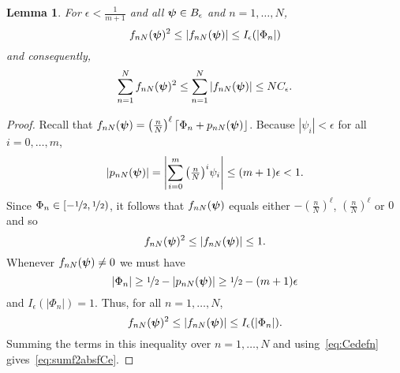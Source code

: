 \documentclass[aap,preprint]{imsart}
\newcommand{\abs}[1]{\left\vert #1 \right\vert}
\newcommand{\round}[1]{{\left\lceil #1 \right\rfloor}}
\newtheorem{lemma}{Lemma}
\begin{document}
\begin{lemma}\label{lem:epslmlemma}
For $\epsilon < \frac{1}{m+1}$ and all $\boldsymbol{\psi} \in B_\epsilon$ and $n = 1, \dots, N$,
\[
f_{nN}(\psibf)^2 \leq \abs{f_{nN}(\psibf)} \leq I_\epsilon(\abs{\Phi_n})
\]
and consequently,
\begin{equation}\label{eq:sumf2absfCe}
\sum_{n=1}^{N}f_{nN}(\psibf)^2 \leq \sum_{n=1}^{N}\abs{f_{nN}(\psibf)} \leq N C_\epsilon.
\end{equation}
\end{lemma}
\begin{proof}
Recall that $f_{nN}(\psibf) = \left( \tfrac{n}{N}\right)^\ell \round{\Phi_n + p_{nN}(\psibf)}$.  Because $\abs{\psi_i} < \epsilon$ for all $i = 0, \dots, m$, 
\begin{equation}\label{eq:pnNsmall}
\abs{p_{nN}(\psibf)} = \abs{\sum_{i=0}^{m}\big(\tfrac{n}{N}\big)^i \psi_i} \leq (m+1)\epsilon < 1.
\end{equation}
Since $\Phi_n \in [-\nicefrac{1}{2}, \nicefrac{1}{2})$, it follows that $f_{nN}(\boldsymbol{\psi})$ equals either $-(\tfrac{n}{N})^\ell$, $(\tfrac{n}{N})^\ell$ or $0$ and so
\begin{equation}\label{eq:fnNleqfnNs}
   f_{nN}(\psibf)^2 \leq \abs{f_{nN}(\psibf)} \leq 1.
\end{equation}
Whenever $f_{nN}(\boldsymbol{\psi}) \neq 0$ we must have 
\[
\abs{\Phi_n} \geq \nicefrac{1}{2} - \abs{p_{nN}(\psibf)} \geq \nicefrac{1}{2} - (m+1)\epsilon
\]
and $I_\epsilon(\abs{\Phi_n}) = 1$.  Thus, for all $n = 1, \dots, N$,
\[
f_{nN}(\psibf)^2 \leq \abs{f_{nN}(\psibf)} \leq I_\epsilon(\abs{\Phi_n}). %
\]
Summing the terms in this inequality over $n = 1, \dots, N$ and using~\eqref{eq:Cedefn} gives~\eqref{eq:sumf2absfCe}.
\end{proof}
\end{document}

